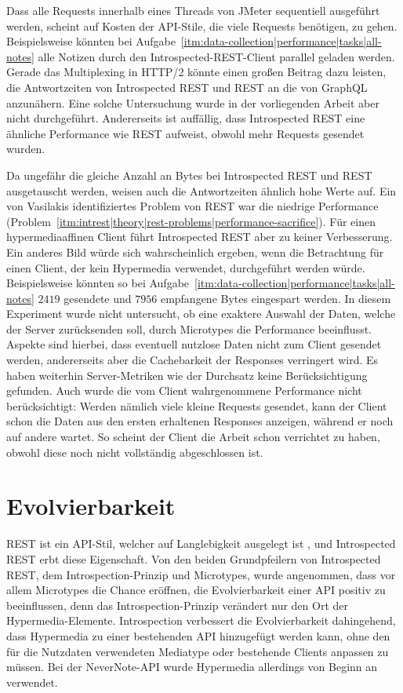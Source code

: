 Dass alle Requests innerhalb eines Threads von JMeter sequentiell ausgeführt werden, scheint auf Kosten der API-Stile, die viele Requests benötigen, zu gehen. Beispielsweise könnten bei Aufgabe~\ref{itm:data-collection|performance|tasks|all-notes} alle Notizen durch den Introspected-REST-Client parallel geladen werden. Gerade das Multiplexing in HTTP/2 könnte einen großen Beitrag dazu leisten, die Antwortzeiten von Introspected REST und REST an die von GraphQL anzunähern. Eine solche Untersuchung wurde in der vorliegenden Arbeit aber nicht durchgeführt. Andererseits ist auffällig, dass Introspected REST eine ähnliche Performance wie REST aufweist, obwohl mehr Requests gesendet wurden.

Da ungefähr die gleiche Anzahl an Bytes bei Introspected REST und REST ausgetauscht werden, weisen auch die Antwortzeiten ähnlich hohe Werte auf. Ein von Vasilakis identifiziertes Problem von REST war die niedrige Performance (Problem~\ref{itm:intrest|theory|rest-problems|performance-sacrifice}). Für einen hypermediaaffinen Client führt Introspected REST aber zu keiner Verbesserung. Ein anderes Bild würde sich wahrscheinlich ergeben, wenn die Betrachtung für einen Client, der kein Hypermedia verwendet, durchgeführt werden würde. Beispielsweise könnten so bei Aufgabe~\ref{itm:data-collection|performance|tasks|all-notes} \(2419\) gesendete und \(7956\) empfangene Bytes eingespart werden. In diesem Experiment wurde nicht untersucht, ob eine exaktere Auswahl der Daten, welche der Server zurücksenden soll, durch Microtypes die Performance beeinflusst. Aspekte sind hierbei, dass eventuell nutzlose Daten nicht zum Client gesendet werden, andererseits aber die Cachebarkeit der Responses verringert wird. Es haben weiterhin Server-Metriken wie der Durchsatz keine Berücksichtigung gefunden. Auch wurde die vom Client wahrgenommene Performance nicht berücksichtigt: Werden nämlich viele kleine Requests gesendet, kann der Client schon die Daten aus den ersten erhaltenen Responses anzeigen, während er noch auf andere wartet. So scheint der Client die Arbeit schon verrichtet zu haben, obwohl diese noch nicht vollständig abgeschlossen ist. 

\section{Evolvierbarkeit}\label{sec:discussion|evolvability}

REST ist ein API-Stil, welcher auf Langlebigkeit ausgelegt ist \autocite[S.~41]{Block2014}, und Introspected REST erbt diese Eigenschaft. Von den beiden Grundpfeilern von Introspected REST, dem Introspection-Prinzip und Microtypes, wurde angenommen, dass vor allem Microtypes die Chance eröffnen, die Evolvierbarkeit einer API positiv zu beeinflussen, denn das Introspection-Prinzip verändert nur den Ort der Hypermedia-Elemente. Introspection verbessert die Evolvierbarkeit dahingehend, dass Hypermedia zu einer bestehenden API hinzugefügt werden kann, ohne den für die Nutzdaten verwendeten Mediatype oder bestehende Clients anpassen zu müssen. Bei der NeverNote-API wurde Hypermedia allerdings von Beginn an verwendet.

